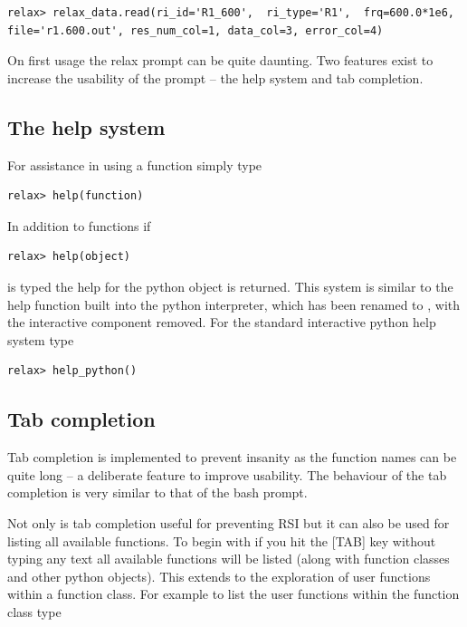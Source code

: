 \begin{lstlisting}[numbers=none]
relax> relax_data.read(ri_id='R1_600',  ri_type='R1',  frq=600.0*1e6, file='r1.600.out', res_num_col=1, data_col=3, error_col=4)
\end{lstlisting}

On first usage the relax prompt can be quite daunting.
Two features exist to increase the usability of the prompt -- the help system and tab completion.




\subsection{The help system}

For assistance in using a function simply type

\begin{lstlisting}[numbers=none]
relax> help(function)
\end{lstlisting}

In addition to functions if

\begin{lstlisting}[numbers=none]
relax> help(object)
\end{lstlisting}

is typed the help for the python object is returned.
This system is similar to the help function built into the python interpreter, which has been renamed to , with the interactive component removed.
For the standard interactive python help system type

\begin{lstlisting}[numbers=none]
relax> help_python()
\end{lstlisting}





\subsection{Tab completion}

Tab completion is implemented to prevent insanity as the function names can be quite long -- a deliberate feature to improve usability.
The behaviour of the tab completion is very similar to that of the bash prompt.

Not only is tab completion useful for preventing RSI but it can also be used for listing all available functions.
To begin with if you hit the [TAB] key without typing any text all available functions will be listed (along with function classes and other python objects).
This extends to the exploration of user functions within a function class.
For example to list the user functions within the function class  type

